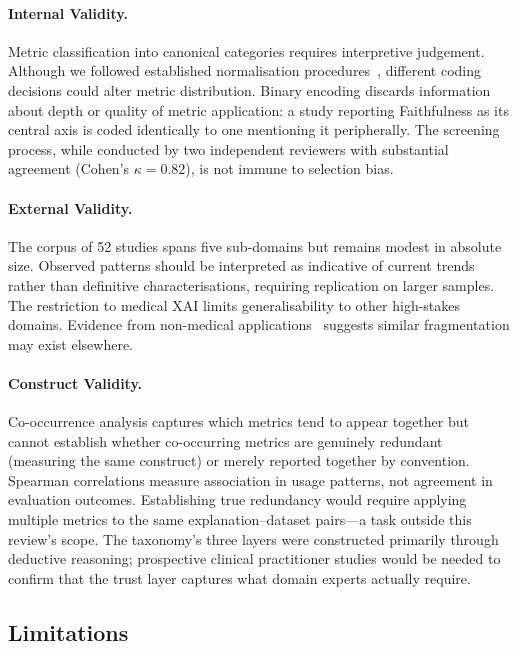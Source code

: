 \paragraph{Internal Validity.}
Metric classification into canonical categories requires interpretive judgement. Although we followed established normalisation procedures~\cite{rosenfeld2021better,kadir2023evaluation}, different coding decisions could alter metric distribution. Binary encoding discards information about depth or quality of metric application: a study reporting Faithfulness as its central axis is coded identically to one mentioning it peripherally. The screening process, while conducted by two independent reviewers with substantial agreement (Cohen's $\kappa = 0.82$), is not immune to selection bias.

\paragraph{External Validity.}
The corpus of 52 studies spans five sub-domains but remains modest in absolute size. Observed patterns should be interpreted as indicative of current trends rather than definitive characterisations, requiring replication on larger samples. The restriction to medical XAI limits generalisability to other high-stakes domains. Evidence from non-medical applications~\cite{Ghosh2024DemystifyingEC,Nagy2024ImprovingUM} suggests similar fragmentation may exist elsewhere.

\paragraph{Construct Validity.}
Co-occurrence analysis captures which metrics tend to appear together but cannot establish whether co-occurring metrics are genuinely redundant (measuring the same construct) or merely reported together by convention. Spearman correlations measure association in usage patterns, not agreement in evaluation outcomes. Establishing true redundancy would require applying multiple metrics to the same explanation--dataset pairs---a task outside this review's scope. The taxonomy's three layers were constructed primarily through deductive reasoning; prospective clinical practitioner studies would be needed to confirm that the trust layer captures what domain experts actually require.

\subsection{Limitations}

